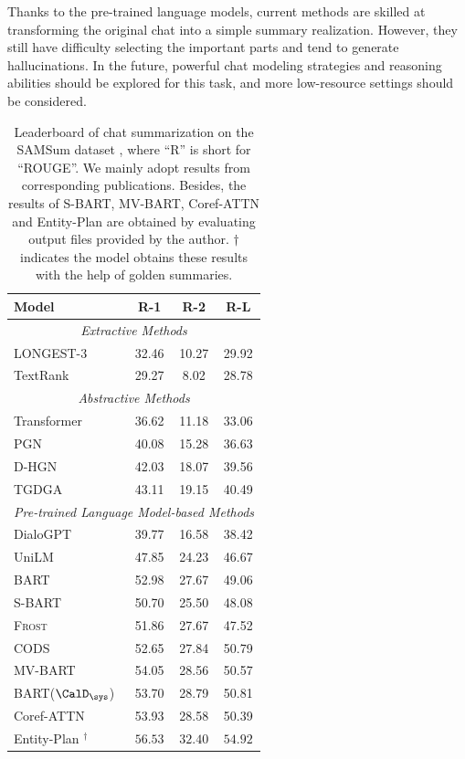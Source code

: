 Thanks to the pre-trained language models, current methods are skilled at transforming the original chat into a simple summary realization. However, they still have difficulty selecting the important parts and tend to generate hallucinations. In the future, powerful chat modeling strategies and reasoning abilities should be explored for this task, and more low-resource settings should be considered.
\begin{table}[t]
\small
\centering
        \begin{tabular}{l|ccc}
            \hline
            \textbf{Model} & \textbf{R-1} & \textbf{R-2} & \textbf{R-L}  \\
            \hline
            \hline
            \multicolumn{4}{c}{\it Extractive Methods} \\
            \hline
            LONGEST-3 &32.46 &10.27 &29.92 \\
            TextRank  &29.27 &8.02 &28.78 \\
            \hline
            \hline
            \multicolumn{4}{c}{\it Abstractive Methods} \\
            \hline
            Transformer  &36.62 &11.18 &33.06 \\
            PGN  & 40.08 & 15.28 & 36.63 \\
            D-HGN  &42.03  &18.07  &39.56   \\
            TGDGA  &43.11 &19.15 &40.49 \\
            \hline
            \hline
            \multicolumn{4}{c}{\it Pre-trained Language Model-based Methods} \\
            \hline
            DialoGPT  &39.77 &16.58 &38.42 \\
            \hdashline[1pt/3pt]
            UniLM  & 47.85 & 24.23 & 46.67 \\
            BART  &52.98 &27.67 &49.06 \\
            \hdashline[1pt/3pt] 
            S-BART  & 50.70 & 25.50 & 48.08 \\
            \textsc{Frost}  & 51.86 & 27.67 & 47.52 \\
            CODS  & 52.65 & 27.84 & 50.79 \\
            MV-BART  &54.05 &28.56  &50.57 \\
            BART($\CalD_{\sys}$)  &53.70 &28.79 &50.81 \\
            Coref-ATTN  & 53.93 & 28.58 & 50.39 \\
            \hdashline[1pt/3pt] 
            Entity-Plan $^{\dagger}$ & $\text{56.53}$ & $\text{32.40}$ & $\text{54.92}$ \\
            \hline
        \end{tabular}
\caption{Leaderboard of chat summarization on the SAMSum dataset \protect, where ``R'' is short for ``ROUGE''. We mainly adopt results from corresponding publications. Besides, the results of S-BART, MV-BART, Coref-ATTN and Entity-Plan are obtained by evaluating output files provided by the author. $\dagger$ indicates the model obtains these results with the help of golden summaries.}
\label{tab:samsum_bench}
\end{table}

